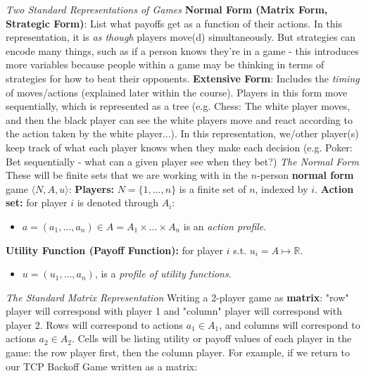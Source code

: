 \documentclass{article}
\begin{document}
\emph{Two Standard Representations of Games}
\vskip 0.1in
\textbf{Normal Form (Matrix Form, Strategic Form)}: List what payoffs get as a function of their actions. In this representation, it is \emph{as though} players move(d) simultaneously. But strategies can encode many things, such as if a person knows they're in a game - this introduces more variables because people within a game may be thinking in terms of strategies for how to beat their opponents.
\vskip 0.1in
\textbf{Extensive Form}: Includes the \emph{timing} of moves/actions (explained later within the course). Players in this form move sequentially, which is represented as a tree (e.g. Chess: The white player moves, and then the black player can see the white players move and react according to the action taken by the white player...). In this representation, we/other player(s) keep track of what each player knows when they make each decision (e.g. Poker: Bet sequentially - what can a given player see when they bet?)
\vskip 0.1in
\emph{The Normal Form}
\vskip 0.1in
These will be finite sets that we are working with in the \(n\)-person
\textbf{normal form} game \(\langle N, A, u \rangle\):
\vskip 0.05in
\textbf{Players:} \(N = \{1, ..., n\}\) is a finite set of \(n\), indexed by \(i\).
\vskip 0.05in
\textbf{Action set:} for player \(i\) is denoted through \(A_{i}\):
\begin{itemize}
    \item \(a = (a_{1}, ..., a_{n}) \in A = A_{1} \times ... \times A_{n}\) is an \emph{action profile}.
\end{itemize}
\vskip 0.05in
\textbf{Utility Function (Payoff Function):} for player \(i\) s.t. \(u_{i} = A \mapsto \mathbb{R} \).
\begin{itemize}
    \item \(u = (u_{1}, ..., a_{n})\), is a \emph{profile of utility functions}.
\end{itemize}
\vskip 0.1in 
\emph{The Standard Matrix Representation}
\vskip 0.1in
Writing a 2-player game as \textbf{matrix}: "row" player will correspond with player 1 and "column" player will correspond with player 2. Rows will correspond to actions \(a_{1} \in A_{1}\), and columns will correspond to actions \(a_{2} \in A_{2}\). Cells will be listing utility or payoff values of each player in the game: the row player first, then the column player. For example, if we return to our TCP Backoff Game written as a matrix: 
\end{document}
